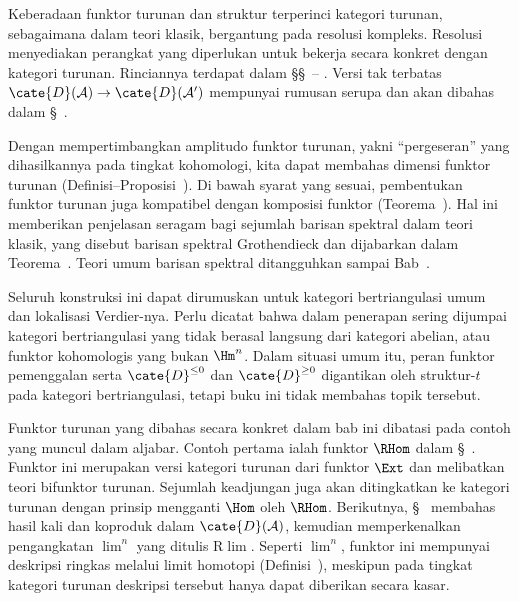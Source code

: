 Keberadaan funktor turunan dan struktur terperinci kategori turunan, sebagaimana
dalam teori klasik, bergantung pada resolusi kompleks. Resolusi menyediakan
perangkat yang diperlukan untuk bekerja secara konkret dengan kategori turunan.
Rinciannya terdapat dalam
\S\S~--%
. Versi tak terbatas
$\cate{D}(\mathcal{A})\to\cate{D}(\mathcal{A}')$ mempunyai rumusan serupa
dan akan dibahas dalam \S~.

Dengan mempertimbangkan amplitudo funktor turunan, yakni ``pergeseran'' yang
dihasilkannya pada tingkat kohomologi, kita dapat membahas dimensi funktor
turunan (Definisi--Proposisi~).
Di bawah syarat yang sesuai, pembentukan funktor turunan juga kompatibel dengan
komposisi funktor
(Teorema~). Hal ini
memberikan penjelasan seragam bagi sejumlah barisan spektral dalam teori
klasik, yang disebut barisan spektral Grothendieck dan dijabarkan dalam
Teorema~. Teori umum
barisan spektral ditangguhkan sampai Bab~.

Seluruh konstruksi ini dapat dirumuskan untuk kategori bertriangulasi umum dan
lokalisasi Verdier-nya. Perlu dicatat bahwa dalam penerapan sering dijumpai
kategori bertriangulasi yang tidak berasal langsung dari kategori abelian,
atau funktor kohomologis yang bukan $\Hm^n$. Dalam situasi umum itu, peran
funktor pemenggalan serta $\cate{D}^{\leq0}$ dan $\cate{D}^{\geq0}$ digantikan
oleh struktur-$t$ pada kategori bertriangulasi, tetapi buku ini tidak membahas
topik tersebut.

Funktor turunan yang dibahas secara konkret dalam bab ini dibatasi pada contoh
yang muncul dalam aljabar. Contoh pertama ialah funktor $\RHom$ dalam
\S~. Funktor ini merupakan versi kategori
turunan dari funktor $\Ext$ dan melibatkan teori bifunktor turunan. Sejumlah
keadjungan juga akan ditingkatkan ke kategori turunan dengan prinsip mengganti
$\Hom$ oleh $\RHom$. Berikutnya,
\S~ membahas hasil kali dan koproduk dalam
$\cate{D}(\mathcal{A})$, kemudian memperkenalkan pengangkatan $\lim^n$
yang ditulis $\mathrm{R}\lim$. Seperti $\lim^n$, funktor ini mempunyai
deskripsi ringkas melalui limit homotopi
(Definisi~), meskipun pada tingkat
kategori turunan deskripsi tersebut hanya dapat diberikan secara kasar.

